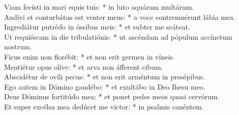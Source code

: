 {	Viam fecísti in mari equis tuis: * in luto aquárum multárum. \\
	Audívi et conturbátus est venter meus: * a voce contremuérunt lábia mea. \\
	Ingrediátur putrédo in óssibus meis: * et subter me scáteat. \\
	Ut requiéscam in die tribulatiónis: * ut ascéndam ad pópulum accínctum nostrum. \\
	Ficus enim non florébit: * et non erit germen in víneis. \\
	Mentiétur opus olíve: * et arva non áfferent cibum. \\
	Abscidétur de ovíli pecus: * et non erit arméntum in presépibus. \\
	Ego autem in Dómino gaudébo: * et exultábo in Deo Ihesu meo. \\
	Deus Dóminus fortitúdo mea: * et ponet pedes meos quasi cervórum. \\
	Et super excélsa mea dedúcet me victor: * in psalmis canéntem.
}

